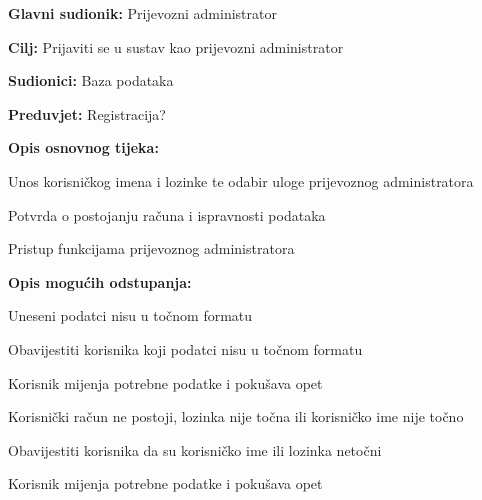 				\noindent {}
				\begin{packed_item}
					
					\item \textbf{Glavni sudionik: }Prijevozni administrator
					\item  \textbf{Cilj:} Prijaviti se u sustav kao prijevozni administrator
					\item  \textbf{Sudionici:} Baza podataka
					\item  \textbf{Preduvjet:} Registracija?
					\item  \textbf{Opis osnovnog tijeka:}
					
					\item[] \begin{packed_enum}
						
						\item Unos korisničkog imena i lozinke te odabir uloge prijevoznog administratora
						\item Potvrda o postojanju računa i ispravnosti podataka
						\item Pristup funkcijama prijevoznog administratora
					\end{packed_enum}
					
					\item  \textbf{Opis mogućih odstupanja:}
					
					\item[] \begin{packed_item}
						
						\item[2.a] Uneseni podatci nisu u točnom formatu
						\item[] \begin{packed_enum}
							
							\item Obavijestiti korisnika koji podatci nisu u točnom formatu
							\item Korisnik mijenja potrebne podatke i pokušava opet
							
						\end{packed_enum}
						\item[2.b] Korisnički račun ne postoji, lozinka nije točna ili korisničko ime nije točno
						\item[] \begin{packed_enum}
							
							\item Obavijestiti korisnika da su korisničko ime ili lozinka netočni
							\item Korisnik mijenja potrebne podatke i pokušava opet
							
						\end{packed_enum}
						
						
					\end{packed_item}
				\end{packed_item}
				
